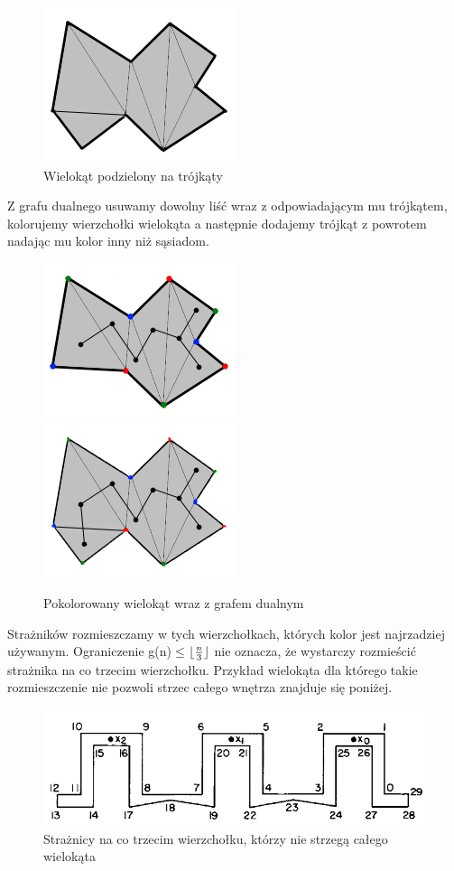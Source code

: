 \documentclass[brudnopis]{xmgr}
\DeclarePairedDelimiter\floor{\lfloor}{\rfloor}
\begin{document}
\begin{figure}[ht!]
  \centering
  \includegraphics{rysunki/dual.png}
    \caption{Wielokąt podzielony na trójkąty}
\end{figure} 
Z grafu dualnego usuwamy dowolny liść wraz z odpowiadającym mu trójkątem, kolorujemy wierzchołki wielokąta a następnie dodajemy trójkąt z powrotem nadając mu kolor inny niż sąsiadom.
\begin{figure}[ht!]
  \centering
    \includegraphics{rysunki/dual_kolor.png} 
    \includegraphics{rysunki/dual_caly_kolor.png}
    \caption{Pokolorowany wielokąt wraz z grafem dualnym}
\end{figure} 
Strażników rozmieszczamy w tych wierzchołkach, których kolor jest najrzadziej używanym.
\newpage\indent Ograniczenie g(n)$\le$$\floor{\frac{n}{3}}$ nie oznacza, że wystarczy rozmieścić strażnika na co trzecim wierzchołku. Przykład wielokąta dla którego takie rozmieszczenie nie pozwoli strzec całego wnętrza znajduje się poniżej.
\begin{figure}[ht!]
  \centering
  \includegraphics{rysunki/co_trzeci.png}
  \caption{Strażnicy na co trzecim wierzchołku, którzy nie strzegą całego wielokąta}
\end{figure} 
\end{document}
